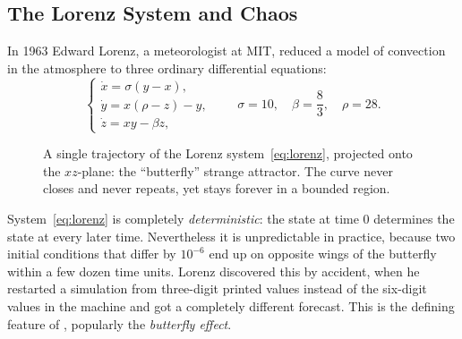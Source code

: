 \subsection{The Lorenz System and Chaos}


\begin{eg}
	In 1963 Edward Lorenz, a meteorologist at MIT, reduced a model of convection in the
	atmosphere to three ordinary differential equations:
	\begin{equation}\label{eq:lorenz}
		\begin{cases}
			\dot{x} = \sigma ( y - x ),   \\
			\dot{y} = x ( \rho - z ) - y, \\
			\dot{z} = x y - \beta z,
		\end{cases}
		\qquad
		\sigma = 10, \quad \beta = \frac{8}{3}, \quad \rho = 28.
	\end{equation}
\end{eg}

\begin{figure}[H]
	\centering
	\caption{A single trajectory of the Lorenz system~\eqref{eq:lorenz}, projected onto
		the \(xz\)-plane: the ``butterfly'' strange attractor. The curve never closes and
		never repeats, yet stays forever in a bounded region.}
\end{figure}

\begin{observation}
	System~\eqref{eq:lorenz} is completely \emph{deterministic}: the state at time \(0\)
	determines the state at every later time. Nevertheless it is unpredictable in
	practice, because two initial conditions that differ by \(10^{-6}\) end up on opposite
	wings of the butterfly within a few dozen time units. Lorenz discovered this by
	accident, when he restarted a simulation from three-digit printed values instead of
	the six-digit values in the machine and got a completely different forecast. This
	 is the defining feature of
	, popularly the \emph{butterfly effect}.
\end{observation}

